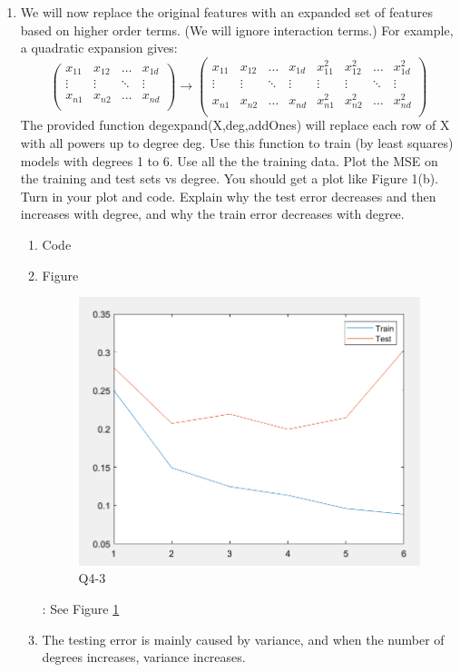 \documentclass[11pt]{article}
\newcommand{\mfile}[1]  {{\small }} %
\begin{document}
\begin{enumerate}
	\item We will now replace the original features with an expanded set of features based on higher order terms. (We
	will ignore interaction terms.) For example, a quadratic expansion gives:
	\begin{equation}
		\begin{pmatrix}
			x_{11} & x_{12} & \dots & x_{1d} \\
			\vdots& \vdots & \ddots & \vdots \\
			x_{n1}& x_{n2} & \dots & x_{nd} \\
		\end{pmatrix}\xrightarrow[]{}\begin{pmatrix}
			x_{11} & x_{12} & \dots & x_{1d}& x_{11}^2 & x_{12}^2 & \dots & x_{1d}^2\\
			\vdots& \vdots & \ddots & \vdots&\vdots& \vdots & \ddots & \vdots \\
			x_{n1}& x_{n2} & \dots & x_{nd}& x_{n1}^2& x_{n2}^2 & \dots & x_{nd}^2\\
		\end{pmatrix}
	\end{equation}
The provided function degexpand(X,deg,addOnes) will replace each row of X with all powers up to degree deg. Use
this function to train (by least squares) models with degrees 1 to 6. Use all the the training data. Plot the MSE on
the training and test sets vs degree. You should get a plot like Figure 1(b). Turn in your plot and code. Explain
why the test error decreases and then increases with degree, and why the train error decreases with degree.
	\begin{enumerate}
		\item Code \mfile{q4_3.m}
		\item Figure
		\begin{figure}[h!]
			\centering
			\includegraphics[width=0.5\linewidth]{Q43.png}
			\caption{Q4-3}
			\label{fig:Q4_3}
		\end{figure}:
		See Figure \ref{fig:Q4_3}
		\item The testing error is mainly caused by variance, and when the number of degrees increases, variance increases.
	\end{enumerate}


\end{enumerate}
\end{document}
